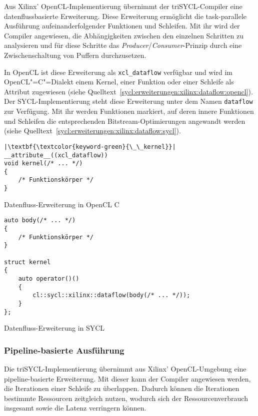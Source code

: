Aus Xilinx' OpenCL-Implementierung übernimmt der triSYCL-Compiler eine
datenflussbasierte Erweiterung. Diese Erweiterung ermöglicht die task-parallele
Ausführung aufeinanderfolgender Funktionen und Schleifen. Mit ihr wird der
Compiler angewiesen, die Abhängigkeiten zwischen den einzelnen Schritten zu
analysieren und für diese Schritte das
\textit{Producer}/\textit{Consumer}-Prinzip durch eine Zwischenschaltung von
Puffern durchzusetzen. \cite[siehe][70\psqq]{sdaccelopt2019}

In OpenCL ist diese Erweiterung als \texttt{xcl\_dataflow} verfügbar und wird
im OpenCL"=C"=Dialekt einem Kernel, einer Funktion oder einer Schleife als
Attribut zugewiesen (siehe
Quelltext~\ref{sycl:erweiterungen:xilinx:dataflow:opencl}). Der
SYCL-Implementierung steht diese Erweiterung unter dem Namen \texttt{dataflow}
zur Verfügung. Mit ihr werden Funktionen markiert, auf deren innere Funktionen
und Schleifen die entsprechenden Bitstream-Optimierungen angewandt werden (siehe
Quelltext~\ref{sycl:erweiterungen:xilinx:dataflow:sycl}).

\begin{code}
    \begin{verbatim}
|\textbf{\textcolor{keyword-green}{\_\_kernel}}| __attribute__((xcl_dataflow))
void kernel(/* ... */)
{
    /* Funktionskörper */
}
    \end{verbatim}
    \caption{Datenfluss-Erweiterung in OpenCL C}
    \label{sycl:erweiterungen:xilinx:dataflow:opencl}
\end{code}

\begin{code}
    \begin{verbatim}
auto body(/* ... */)
{
    /* Funktionskörper */
}

struct kernel
{
    auto operator()()
    {
        cl::sycl::xilinx::dataflow(body(/* ... */));
    }
};
    \end{verbatim}
    \caption{Datenfluss-Erweiterung in SYCL}
    \label{sycl:erweiterungen:xilinx:dataflow:sycl}
\end{code}

\subsubsection{Pipeline-basierte Ausführung}
\label{sycl:erweiterungen:xilinx:pipeline}

Die triSYCL-Implementierung übernimmt aus Xilinx' OpenCL-Umgebung eine
pipeline-basierte Erweiterung. Mit dieser kann der Compiler angewiesen werden,
die Iterationen einer Schleife zu überlappen. Dadurch können die Iterationen
bestimmte Ressourcen zeitgleich nutzen, wodurch sich der Ressourcenverbrauch
insgesamt sowie die Latenz verringern können.
\cite[siehe][67\psqq]{sdaccelopt2019}

